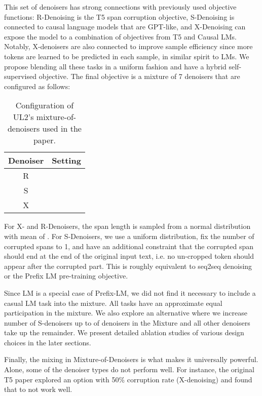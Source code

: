 \documentclass[10pt]{article}
\begin{document}
This set of denoisers has strong connections with previously used objective functions: R-Denoising is the T5 span corruption objective, S-Denoising is connected to causal language models that are GPT-like, and X-Denoising can expose the model to a combination of objectives from T5 and Causal LMs. Notably, X-denoisers are also connected to improve sample efficiency since more tokens are learned to be predicted in each sample, in similar spirit to LMs. We propose blending all these tasks in a uniform fashion and have a hybrid self-supervised objective. The final objective is a mixture of 7 denoisers that are configured as follows: 
\begin{table}[H]
    \centering
    \begin{tabular}{cp{8cm}}
    \toprule
    Denoiser & Setting \\
    \midrule
      R   &  \\
      S   &  \\ 
      X &   \\
\bottomrule
    \end{tabular}
    \caption{Configuration of UL2's mixture-of-denoisers used in the paper.}
    \label{tab:my_label}
\end{table}







For X- and R-Denoisers, the span length is sampled from a normal distribution with mean of . For S-Denoisers, we use a uniform distribution, fix the number of corrupted spans to 1, and have an additional constraint that the corrupted span should end at the end of the original input text, i.e. no un-cropped token should appear after the corrupted part. This is roughly equivalent to seq2seq denoising or the Prefix LM pre-training objective. 

Since LM is a special case of Prefix-LM, we did not find it necessary to include a casual LM task into the mixture. All tasks have an approximate equal participation in the mixture. We also explore an alternative where we increase number of S-denoisers up to  of denoisers in the Mixture and all other denoisers take up the remainder. We present detailed ablation studies of various design choices in the later sections.

Finally, the mixing in Mixture-of-Denoisers is what makes it universally powerful. Alone,  some of the denoiser types do not perform well. For instance, the original T5 paper explored an option with 50\% corruption rate (X-denoising) and found that to not work well. 
\end{document}
